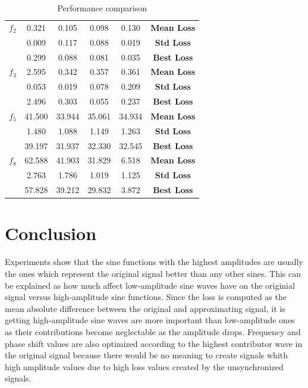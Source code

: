 \documentclass[conference]{IEEEtran}
\begin{document}
\begin{table}[h]
	\centering
	\begin{tabular}{|c|c|c|c|c|c|}
		\hline
		\backslashbox{Target}{Obtained} & \makebox[2em]{$f_1^\prime$} & \makebox[2em]{$f_2^\prime$} & \makebox[2em]{$f_3^\prime$} & \makebox[2em]{$f_5^\prime$} & \\
		\hline
		$f_2$ 	& 0.321 & 0.105 & 0.098 & 0.130 & \textbf{Mean Loss} \\
				& 0.009 & 0.117 & 0.088 & 0.019 & \textbf{Std Loss} \\
				& 0.299 & 0.088 & 0.081 & 0.035 & \textbf{Best Loss} \\
		\hline
		$f_3$ 	& 2.595 & 0.342 & 0.357 & 0.361 & \textbf{Mean Loss} \\
				& 0.053 & 0.019 & 0.078 & 0.209 & \textbf{Std Loss} \\
				& 2.496 & 0.303 & 0.055 & 0.237 & \textbf{Best Loss} \\
		\hline
		$f_5$ 	& 41.500 & 33.944 & 35.061 & 34.934 & \textbf{Mean Loss} \\
				& 1.480 & 1.088 & 1.149 & 1.263 & \textbf{Std Loss} \\
				& 39.197 & 31.937 & 32.330 & 32.545 & \textbf{Best Loss} \\
		\hline
		$f_8$ 	& 62.588 & 41.903 & 31.829 & 6.518 & \textbf{Mean Loss} \\
				& 2.763 & 1.786 & 1.019 & 1.125 & \textbf{Std Loss} \\
				& 57.828 & 39.212 & 29.832 & 3.872 & \textbf{Best Loss} \\
		\hline
	\end{tabular}
	\caption{Performance comparison}
	\label{tab:stats}
\end{table}

\section{Conclusion}
Experiments show that the sine functions with the highest amplitudes are usually the ones which represent the original signal better than any other sines. This can be explained as how much affect low-amplitude 
sine waves have on the originial signal versus high-amplitude sine functions. Since the loss is computed as the mean absolute difference between the original and approximating signal, it is getting 
high-amplitude sine waves are more important than low-amplitude ones as their contributions become neglectable as the amplitude drops. Frequency and phase shift values are also optimized according to the 
highest contributor wave in the original signal because there would be no meaning to create signals whith high amplitude values due to high loss values created by the unsynchronized signals.
\end{document}
